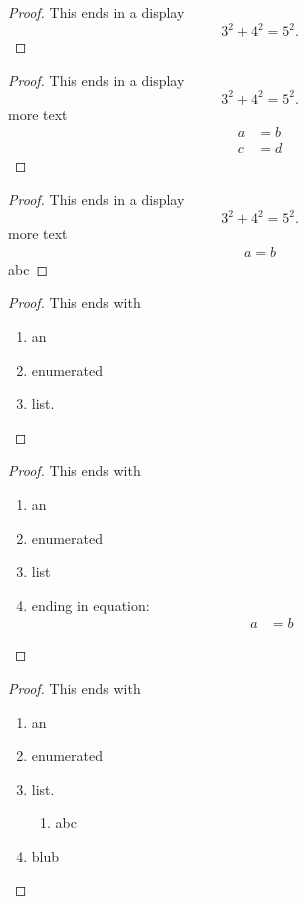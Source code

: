 \documentclass[leqno]{article}
\begin{document}
\begin{proof}
  This ends in a display
  \[
    3^2 + 4^2 = 5^2.
  \]
\end{proof}

\begin{proof}
  This ends in a display
  \[
    3^2 + 4^2 = 5^2.
  \]
more text
\begin{align}
a&=b \\
c&=d
\end{align}
\end{proof}

\begin{proof}
  This ends in a display
  \[
    3^2 + 4^2 = 5^2.
  \]
more text
\begin{align*}
a=b
\end{align*}
abc
\end{proof}

\begin{proof}
  This ends with
  \begin{enumerate}
  \item an
  \item enumerated
  \item list.
  \end{enumerate}
\end{proof}

\begin{proof}
  This ends with
  \begin{enumerate}
  \item an
  \item enumerated
  \item list
  \item ending in equation:
  \begin{align*}
  a&=b
  \end{align*}
  \end{enumerate}
\end{proof}

\begin{proof}
  This ends with
  \begin{enumerate}
  \item an
  \item enumerated
  \item list.
  \begin{enumerate}
  \item abc
  \end{enumerate}
  \item blub
  \end{enumerate}
\end{proof}
\end{document}
